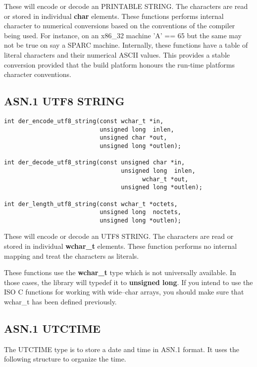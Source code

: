 \documentclass[synpaper]{book}
\begin{document}
These will encode or decode an PRINTABLE STRING.  The characters are read or stored in individual \textbf{char} elements.  These functions performs internal character
to numerical conversions based on the conventions of the compiler being used.  For instance, on an x86\_32 machine 'A' == 65 but the same may not be true on 
say a SPARC machine.  Internally, these functions have a table of literal characters and their numerical ASCII values.  This provides a stable conversion provided
that the build platform honours the run-time platforms character conventions.

\subsection{ASN.1 UTF8 STRING}

\begin{verbatim}
int der_encode_utf8_string(const wchar_t *in, 
                           unsigned long  inlen,
                           unsigned char *out, 
                           unsigned long *outlen);

int der_decode_utf8_string(const unsigned char *in, 
                                 unsigned long  inlen,
                                       wchar_t *out, 
                                 unsigned long *outlen);

int der_length_utf8_string(const wchar_t *octets, 
                           unsigned long  noctets, 
                           unsigned long *outlen);
\end{verbatim}

These will encode or decode an UTF8 STRING.  The characters are read or stored in individual \textbf{wchar\_t} elements.  These function performs no internal
mapping and treat the characters as literals.  

These functions use the \textbf{wchar\_t} type which is not universally available.  In those cases, the library will typedef it to \textbf{unsigned long}.  If you 
intend to use the ISO C functions for working with wide--char arrays, you should make sure that wchar\_t has been defined previously.

\subsection{ASN.1 UTCTIME}

The UTCTIME type is to store a date and time in ASN.1 format.  It uses the following structure to organize the time.
\end{document}
